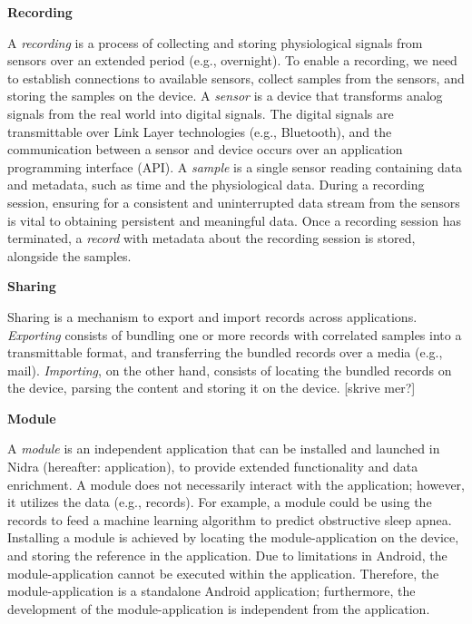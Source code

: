 
\noindent\textbf{Recording}

\noindent A \textit{recording} is a process of collecting and storing physiological signals from sensors over an extended period (e.g., overnight). To enable a recording, we need to establish connections to available sensors, collect samples from the sensors, and storing the samples on the device. A \textit{sensor} is a device that transforms analog signals from the real world into digital signals. The digital signals are transmittable over Link Layer technologies (e.g., Bluetooth), and the communication between a sensor and device occurs over an application programming interface (API). A \textit{sample} is a single sensor reading containing data and metadata, such as time and the physiological data. During a recording session, ensuring for a consistent and uninterrupted data stream from the sensors is vital to obtaining persistent and meaningful data.  Once a recording session has terminated, a \textit{record} with metadata about the recording session is stored, alongside the samples.    

\noindent \textbf{Sharing}

\noindent Sharing is a mechanism to export and import records across applications. \textit{Exporting} consists of bundling one or more records with correlated samples into a transmittable format, and transferring the bundled records over a media (e.g., mail). \textit{Importing}, on the other hand, consists of locating the bundled records on the device, parsing the content and storing it on the device. [skrive mer?]

\noindent \textbf{Module}

\noindent A \textit{module} is an independent application that can be installed and launched in Nidra (hereafter: application), to provide extended functionality and data enrichment. A module does not necessarily interact with the application; however, it utilizes the data (e.g., records). For example, a module could be using the records to feed a machine learning algorithm to predict obstructive sleep apnea. Installing a module is achieved by locating the module-application on the device, and storing the reference in the application. Due to limitations in Android, the module-application cannot be executed within the application. Therefore, the module-application is a standalone Android application; furthermore, the development of the module-application is independent from the application. 

